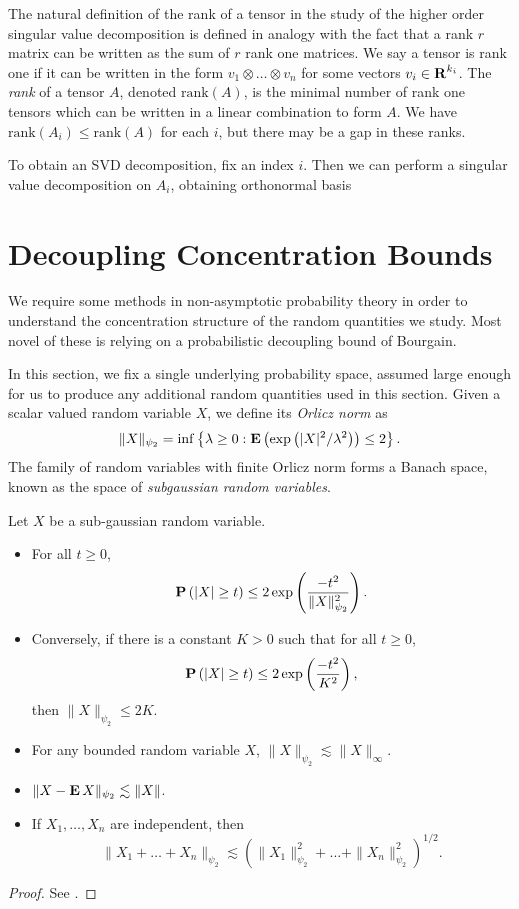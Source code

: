 The natural definition of the rank of a tensor in the study of the higher order singular value decomposition is defined in analogy with the fact that a rank $r$ matrix can be written as the sum of $r$ rank one matrices. We say a tensor is rank one if it can be written in the form $v_1 \otimes \dots \otimes v_n$ for some vectors $v_i \in \operatorname{\mathbf{R}}^{k_i}$. The \emph{rank} of a tensor $A$, denoted $\text{rank}(A)$, is the minimal number of rank one tensors which can be written in a linear combination to form $A$. We have $\text{rank}(A_i) \leq \text{rank}(A)$ for each $i$, but there may be a gap in these ranks.

To obtain an SVD decomposition, fix an index $i$. Then we can perform a singular value decomposition on $A_i$, obtaining orthonormal basis

\section{Decoupling Concentration Bounds}

We require some methods in non-asymptotic probability theory in order to understand the concentration structure of the random quantities we study. Most novel of these is relying on a probabilistic decoupling bound of Bourgain.

In this section, we fix a single underlying probability space, assumed large enough for us to produce any additional random quantities used in this section. Given a scalar valued random variable $X$, we define its \emph{Orlicz norm} as
%
\[ \| X \|_{\psi_2} = \inf \left\{ \lambda \geq 0 : \operatorname{\mathbf{E}} \left(\exp \left( |X|^2/\lambda^2 \right) \right) \leq 2 \right\}. \]
%
The family of random variables with finite Orlicz norm forms a Banach space, known as the space of \emph{subgaussian random variables}.

\begin{theorem}
	Let $X$ be a sub-gaussian random variable.
	\begin{itemize}
		\item For all $t \geq 0$,
		\[ \operatorname{\mathbf{P}} \left( |X| \geq t \right) \leq 2 \exp \left( \frac{-t^2}{\| X \|_{\psi_2}^2} \right). \]

		\item Conversely, if there is a constant $K > 0$ such that for all $t \geq 0$,
		\[ \operatorname{\mathbf{P}} \left( |X| \geq t \right) \leq 2 \exp \left( \frac{-t^2}{K^2} \right), \]
		then $\| X \|_{\psi_2} \leq 2K$.

		\item For any bounded random variable $X$, $\| X \|_{\psi_2} \lesssim \| X \|_\infty$.

		\item $\| X - \operatorname{\mathbf{E}} X \|_{\psi_2} \lesssim \| X \|$.

		\item If $X_1, \dots, X_n$ are independent, then
		\[ \| X_1 + \dots + X_n \|_{\psi_2} \lesssim \left( \| X_1 \|_{\psi_2}^2 + \dots + \| X_n \|_{\psi_2}^2 \right)^{1/2}. \] 
	\end{itemize}
\end{theorem}
\begin{proof} See \cite{Vershynin}. \end{proof}

